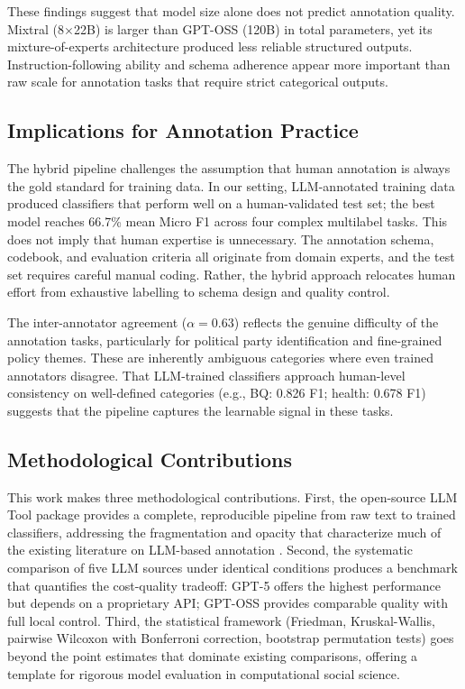 \documentclass[12pt]{article}
\begin{document}
These findings suggest that model size alone does not predict annotation quality. Mixtral (8$\times$22B) is larger than GPT-OSS (120B) in total parameters, yet its mixture-of-experts architecture produced less reliable structured outputs. Instruction-following ability and schema adherence appear more important than raw scale for annotation tasks that require strict categorical outputs.

\subsection{Implications for Annotation Practice}

The hybrid pipeline challenges the assumption that human annotation is always the gold standard for training data. In our setting, LLM-annotated training data produced classifiers that perform well on a human-validated test set; the best model reaches 66.7\% mean Micro F1 across four complex multilabel tasks. This does not imply that human expertise is unnecessary. The annotation schema, codebook, and evaluation criteria all originate from domain experts, and the test set requires careful manual coding. Rather, the hybrid approach relocates human effort from exhaustive labelling to schema design and quality control.

The inter-annotator agreement ($\alpha = 0.63$) reflects the genuine difficulty of the annotation tasks, particularly for political party identification and fine-grained policy themes. These are inherently ambiguous categories where even trained annotators disagree. That LLM-trained classifiers approach human-level consistency on well-defined categories (e.g., BQ: 0.826 F1; health: 0.678 F1) suggests that the pipeline captures the learnable signal in these tasks.

\subsection{Methodological Contributions}

This work makes three methodological contributions. First, the open-source LLM Tool package provides a complete, reproducible pipeline from raw text to trained classifiers, addressing the fragmentation and opacity that characterize much of the existing literature on LLM-based annotation \parencite{weber_reichardt23}. Second, the systematic comparison of five LLM sources under identical conditions produces a benchmark that quantifies the cost-quality tradeoff: GPT-5 offers the highest performance but depends on a proprietary API; GPT-OSS provides comparable quality with full local control. Third, the statistical framework (Friedman, Kruskal-Wallis, pairwise Wilcoxon with Bonferroni correction, bootstrap permutation tests) goes beyond the point estimates that dominate existing comparisons, offering a template for rigorous model evaluation in computational social science.
\end{document}
